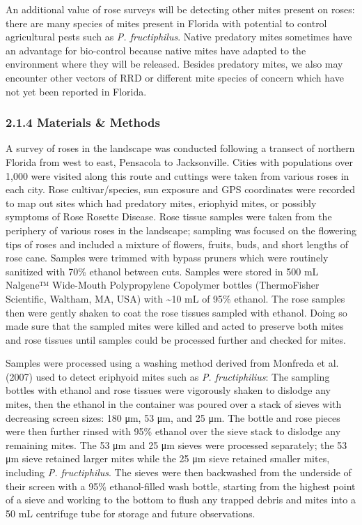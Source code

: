 \documentclass[12pt,final,CPage]{ufthesis}
\begin{document}
{  An additional value of rose surveys will be detecting other mites present on roses: there are many species of mites present in Florida with potential to control agricultural pests such as \emph{P. fructiphilus}. Native predatory mites sometimes have an advantage for bio-control because native mites have adapted to the environment where they will be released. Besides predatory mites, we also may encounter other vectors of RRD or different mite species of concern which have not yet been reported in Florida.

  \hypertarget{materials-methods}{%
  \subsubsection{2.1.4 Materials \& Methods}\label{materials-methods}}

  A survey of roses in the landscape was conducted following a transect of northern Florida from west to east, Pensacola to Jacksonville. Cities with populations over 1,000 were visited along this route and cuttings were taken from various roses in each city. Rose cultivar/species, sun exposure and GPS coordinates were recorded to map out sites which had predatory mites, eriophyid mites, or possibly symptoms of Rose Rosette Disease. Rose tissue samples were taken from the periphery of various roses in the landscape; sampling was focused on the flowering tips of roses and included a mixture of flowers, fruits, buds, and short lengths of rose cane. Samples were trimmed with bypass pruners which were routinely sanitized with 70\% ethanol between cuts. Samples were stored in 500 mL Nalgene™ Wide-Mouth Polypropylene Copolymer bottles (ThermoFisher Scientific, Waltham, MA, USA) with \textasciitilde10 mL of 95\% ethanol. The rose samples then were gently shaken to coat the rose tissues sampled with ethanol. Doing so made sure that the sampled mites were killed and acted to preserve both mites and rose tissues until samples could be processed further and checked for mites.

  Samples were processed using a washing method derived from Monfreda et al. (2007) used to detect eriphyoid mites such as \emph{P. fructiphilius}: The sampling bottles with ethanol and rose tissues were vigorously shaken to dislodge any mites, then the ethanol in the container was poured over a stack of sieves with decreasing screen sizes: 180 \si{\micro\metre}, 53 \si{\micro\metre}, and 25 \si{\micro\metre}. The bottle and rose pieces were then further rinsed with 95\% ethanol over the sieve stack to dislodge any remaining mites. The 53 \si{\micro\metre} and 25 \si{\micro\metre} sieves were processed separately; the 53 \si{\micro\metre} sieve retained larger mites while the 25 \si{\micro\metre} sieve retained smaller mites, including \emph{P. fructiphilus}. The sieves were then backwashed from the underside of their screen with a 95\% ethanol-filled wash bottle, starting from the highest point of a sieve and working to the bottom to flush any trapped debris and mites into a 50 mL centrifuge tube for storage and future observations.

}
\end{document}
